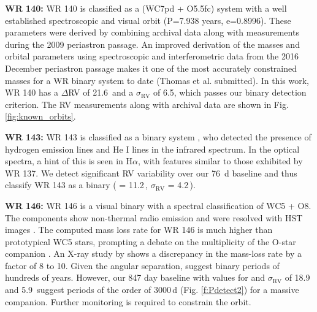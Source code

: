 
\textbf{WR 140:} WR 140 is classified as a (WC7pd + O5.5fc) system with a well established spectroscopic \citep{2011Fahed} and visual \citep[interferometric;][]{2011Monnier} orbit (P=7.938 years, e=0.8996). These parameters were derived by combining archival data along with measurements during the 2009 periastron passage. An improved derivation of the masses and orbital parameters using spectroscopic and interferometric data from the 2016 December periastron passage makes it one of the most accurately constrained masses for a WR binary system to date (Thomas et al. submitted). In this work, WR 140 has a $\Delta$RV of 21.6\kms\, and a $\sigma_\textrm{RV}$ of 6.5\kms, which passes our binary detection criterion. The RV measurements along with archival data are shown in Fig. \ref{fig:known_orbits}.


\textbf{WR 143:} WR 143 is classified as a binary system \citep[WC4 + Be;][]{2006VarricattAshok}, who detected the presence of hydrogen emission lines and He I lines in the infrared spectrum. In the optical spectra, a hint of this is seen in H$\alpha$, with features similar to those exhibited by WR 137. We detect significant RV variability over our 76~d baseline and thus classify WR 143 as a binary (\DelRV{} = 11.2\,\kms{}, $\sigma_\textrm{RV}$ = 4.2\,\kms{}).


\textbf{WR 146:} WR 146 is a visual binary with a spectral classification of WC5 + O8. The components show non-thermal radio emission \citep{1996Dougherty} and were resolved with HST images \citep{1998Niemela}. The computed mass loss rate for WR 146 is much higher than prototypical WC5 stars, prompting a debate on the multiplicity of the O-star companion \citep{2000Dougherty}. An X-ray study by \citet{2017Zhekov} shows a discrepancy in the mass-loss rate by a factor of 8 to 10. Given the angular separation, \citet{1998Niemela} suggest binary periods of hundreds of years. However, our 847 day baseline with values for \DelRV{} and $\sigma_\textrm{RV}$ of 18.9 and 5.9\,\kms{} suggest periods of the order of 3000\,d (Fig. \ref{f:Pdetect2}) for a massive companion. Further monitoring is required to constrain the orbit.

